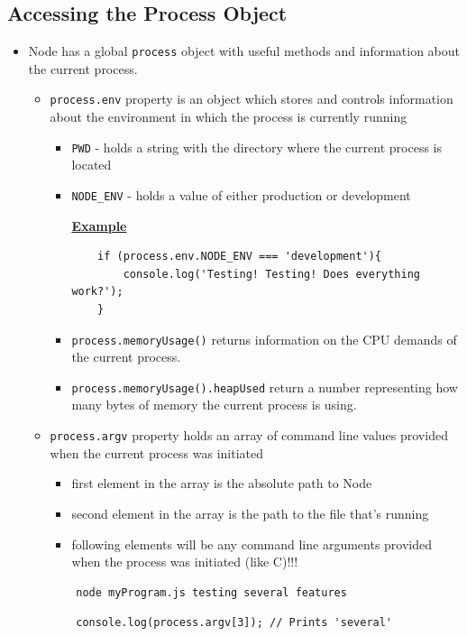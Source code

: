 \documentclass[12pt]{article}
\begin{document}
\subsection{Accessing the Process Object}
\begin{itemize}
    \item Node has a global \texttt{process} object with useful methods and information about the current process.
    \begin{itemize}
        \item \texttt{process.env} property is an object which stores and controls information about the environment in which the process is currently running
        \begin{itemize}
            \item \texttt{PWD} - holds a string with the directory where the current process is located
            \item \texttt{NODE\_ENV} - holds a value of either production or development

            \bigskip

            \underline{\textbf{Example}}

    \begin{lstlisting}
    if (process.env.NODE_ENV === 'development'){
        console.log('Testing! Testing! Does everything work?');
    }
    \end{lstlisting}

            \item \texttt{process.memoryUsage()} returns information on the CPU demands of the current process.
            \item \texttt{process.memoryUsage().heapUsed} return a number representing how many bytes of memory the current process is using.
        \end{itemize}
        \item \texttt{process.argv} property holds an array of command line values provided when the current process was initiated
        \begin{itemize}
            \item first element in the array is the absolute path to Node
            \item second element in the array is the path to the file that’s running
            \item following elements will be any command line arguments provided when the process was initiated (like C)!!!
        \end{itemize}

    \begin{lstlisting}
    node myProgram.js testing several features
    \end{lstlisting}

    \begin{lstlisting}
    console.log(process.argv[3]); // Prints 'several'
    \end{lstlisting}
    \end{itemize}
\end{itemize}
\end{document}
